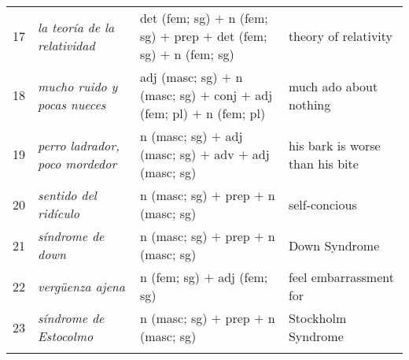 \documentclass[output=paper]{langsci/langscibook}
\begin{document}
\begin{table}
\begin{tabularx}{\textwidth}{c@{~}>{\raggedright}p{3cm}p{5cm}@{~}Q}
17 & \textit{la teoría de la relatividad} & det (fem; sg) $+$ n (fem; sg) $+$ \newline  prep $+$ det (fem; sg) $+$ \newline  n (fem; sg) & theory of relativity  \\  
18 & \textit{mucho ruido y pocas nueces} & adj (masc; sg) $+$ n (masc; sg) $+$ \newline  conj $+$ adj (fem; pl) $+$ n (fem; pl) & much ado about nothing  \\  
19 & \textit{perro ladrador, poco mordedor} & n (masc; sg) $+$ adj (masc; sg) $+$ \newline  adv $+$ adj (masc; sg) & his bark is worse than his bite  \\  
20 & \textit{sentido del ridículo} & n (masc; sg) $+$ prep $+$ \newline  n (masc; sg) & self-concious  \\  
21 & \textit{síndrome de down} & n (masc; sg) $+$ prep $+$ \newline  n (masc; sg) & Down Syndrome  \\  
22 & \textit{vergüenza ajena} & n (fem; sg) $+$ adj (fem; sg) & feel embarrassment for  \\  
23 & \textit{síndrome de Estocolmo} & n (masc; sg) $+$ prep $+$ \newline  n (masc; sg) & Stockholm Syndrome  \\  
\lspbottomrule
\end{tabularx} 
\end{table}
\end{document}
